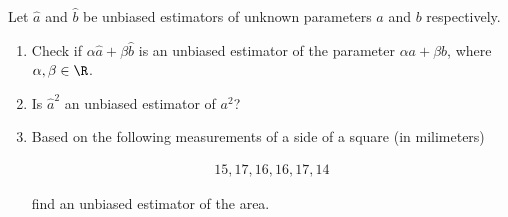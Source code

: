 
\begin{exercise}

Let $\hat a$ and $\hat b$ be unbiased estimators of unknown parameters $a$ and $b$ respectively.

\begin{enumerate}[label = (\alph*)]

    \item Check if $\alpha \hat a + \beta \hat b$ is an unbiased estimator of the parameter $\alpha a + \beta b$, where $\alpha, \beta \in \R$.

    \item Is $\hat a^2$ an unbiased estimator of $a^2$?

    \item Based on the following measurements of a side of a square (in milimeters)
    
    \begin{align*}
        15, 17, 16, 16, 17, 14
    \end{align*}

    find an unbiased estimator of the area.

\end{enumerate}

\end{exercise}


